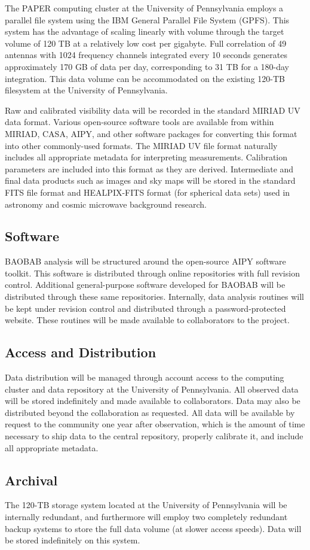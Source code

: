\documentclass[11pt]{article}
\begin{document}
The PAPER computing cluster at the University of
Pennsylvania employs a parallel file system using the IBM General
Parallel File System (GPFS). This system has the advantage of scaling linearly
with volume through the target volume of 120 TB at a relatively low cost per
gigabyte.  
Full correlation of 49 antennas with 1024 frequency channels integrated 
every 10
seconds generates approximately 170 GB of data per day, 
corresponding to 31 TB for a 180-day
integration.  This data volume can be accommodated on the 
existing 120-TB filesystem at the University of Pennsylvania.

Raw and calibrated visibility data will be recorded in the standard
MIRIAD UV data format.  Various open-source software tools are available
from within MIRIAD, CASA, AIPY, and other software packages for converting
this format into other commonly-used formats.  The MIRIAD UV file format
naturally includes all appropriate metadata for interpreting measurements.
Calibration parameters are included into this format as they are derived.
Intermediate and final data products such as images and sky maps will be
stored in the standard FITS file format and HEALPIX-FITS format (for spherical
data sets) used in astronomy and cosmic microwave background research.

\subsection*{Software}

BAOBAB analysis will be structured around the open-source
AIPY software toolkit.
This software is
distributed through online repositories with full revision control.
Additional general-purpose software developed for BAOBAB will be distributed
through these same repositories.  Internally, data analysis routines
will be kept under revision control and distributed through a 
password-protected website.  These routines will be made available to
collaborators to the project.

\subsection*{Access and Distribution}

Data distribution will
be managed through account access to the computing cluster and data
repository at the University of Pennsylvania.  All observed data
will be stored indefinitely and made available to collaborators.  Data
may also be distributed beyond the collaboration as requested.  All data
will be available by request to the community one year after observation,
which is the amount of time necessary to ship data to the central repository,
properly calibrate it, and
include all appropriate metadata.

\subsection*{Archival}

The 120-TB storage system located at the University of Pennsylvania
will be internally redundant, and furthermore will employ two completely
redundant backup systems to store the full data volume (at slower access
speeds).  Data will be stored indefinitely on this system.
\end{document}
